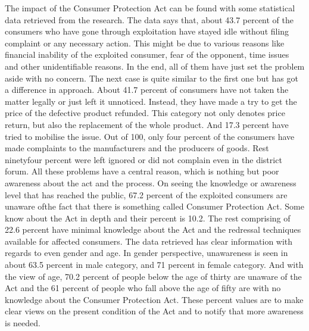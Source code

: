 \begin{multicols}{2}
\noi
The impact of the Consumer Protection Act can be found with some statistical data retrieved
from the research. The data says that, about 43.7 percent of the consumers who have gone
through exploitation have stayed idle without filing complaint or any necessary action. This
might be due to various reasons like financial inability of the exploited consumer, fear of the
opponent, time issues and other unidentifiable reasons. In the end, all of them have just set the
problem aside with no concern. The next case is quite similar to the first one but has got a
difference in approach. About 41.7 percent of consumers have not taken the matter legally or
just left it unnoticed. Instead, they have made a try to get the price of the defective product
refunded. This category not only denotes price return, but also the replacement of the whole
product. And 17.3 percent have tried to mobilise the issue. Out of 100, only four percent of the
consumers have made complaints to the manufacturers and the producers of goods. Rest ninetyfour percent were left ignored or did not complain even in the district forum. All these problems
have a central reason, which is nothing but poor awareness about the act and the process. On
seeing the knowledge or awareness level that has reached the public, 67.2 percent of the
exploited consumers are unaware ofthe fact that there is something called Consumer Protection
Act. Some know about the Act in depth and their percent is 10.2. The rest comprising of 22.6
percent have minimal knowledge about the Act and the redressal techniques available for
affected consumers. The data retrieved has clear information with regards to even gender and
age. In gender perspective, unawareness is seen in about 63.5 percent in male category, and 71
percent in female category. And with the view of age, 70.2 percent of people below the age of
thirty are unaware of the Act and the 61 percent of people who fall above the age of fifty are
with no knowledge about the Consumer Protection Act. These percent values are to make clear
views on the present condition of the Act and to notify that more awareness is needed.


\end{multicols}
